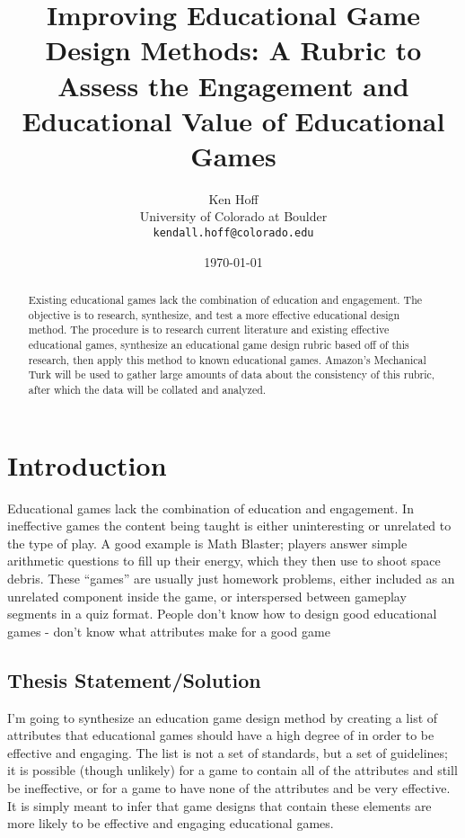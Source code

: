 \documentclass[12pt]{report}
\author{Ken Hoff \\ University of Colorado at Boulder \\ \texttt{kendall.hoff@colorado.edu} 
}
\date{\today}
\title{Improving Educational Game Design Methods: A Rubric to Assess the Engagement and Educational Value of Educational Games
}
\begin{document}
\maketitle

\begin{abstract}

Existing educational games lack the combination of education and engagement. The objective is to research, synthesize, and test a more effective educational design method. The procedure is to research current literature and existing effective educational games, synthesize an educational game design rubric based off of this research, then apply this method to known educational games. Amazon's Mechanical Turk will be used to gather large amounts of data about the consistency of this rubric, after which the data will be collated and analyzed.

\end{abstract}

\tableofcontents
\listoffigures

\chapter{Introduction}
	Educational games lack the combination of education and engagement. In ineffective games the content being taught is either uninteresting or unrelated to the type of play. A good example is Math Blaster; players answer simple arithmetic questions to fill up their energy, which they then use to shoot space debris. These “games” are usually just homework problems, either included as an unrelated component inside the game, or interspersed between gameplay segments in a quiz format.
	People don't know how to design good educational games - don't know what attributes make for a good game

	\section{Thesis Statement/Solution}
		I'm going to synthesize an education game design method by creating a list of attributes that educational games should have a high degree of in order to be effective and engaging. The list is not a set of standards, but a set of guidelines; it is possible (though unlikely) for a game to contain all of the attributes and still be ineffective, or for a game to have none of the attributes and be very effective. It is simply meant to infer that game designs that contain these elements are more likely to be effective and engaging educational games.
\end{document}
